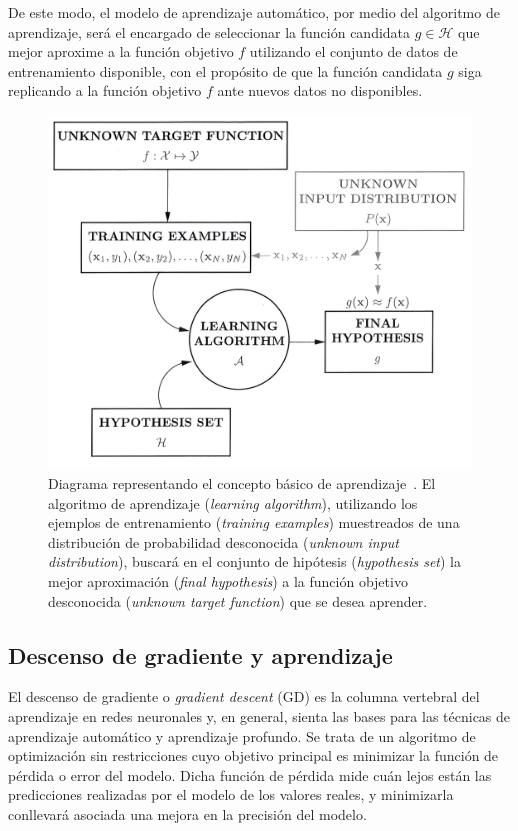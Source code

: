 De este modo, el modelo de aprendizaje automático, por medio del algoritmo de aprendizaje, será el encargado de seleccionar la función candidata $g \in \mathcal{H}$ que mejor aproxime a la función objetivo $f$ utilizando el conjunto de datos de entrenamiento disponible, con el propósito de que la función candidata $g$ siga replicando a la función objetivo $f$ ante nuevos datos no disponibles.\newline

\begin{figure}[h]
    \centering
    \includegraphics[width=0.7\linewidth]{img/learning-diagram.png}
    \caption[Diagrama representando el concepto básico de aprendizaje.]{Diagrama representando el concepto básico de aprendizaje~\cite{Mostafa2012}. El algoritmo de aprendizaje (\textit{learning algorithm}), utilizando los ejemplos de entrenamiento (\textit{training examples}) muestreados de una distribución de probabilidad desconocida (\textit{unknown input distribution}), buscará en el conjunto de hipótesis (\textit{hypothesis set}) la mejor aproximación (\textit{final hypothesis}) a la función objetivo desconocida (\textit{unknown target function}) que se desea aprender.}\label{fig:learning-diagram}
\end{figure}

\subsection{Descenso de gradiente y aprendizaje}\label{subsec:descenso-gradiente}

El descenso de gradiente o \emph{gradient descent} (GD) es la columna vertebral del aprendizaje en redes neuronales y, en general, sienta las bases para las técnicas de aprendizaje automático y aprendizaje profundo. Se trata de un algoritmo de optimización sin restricciones cuyo objetivo principal es minimizar la función de pérdida o error del modelo. Dicha función de pérdida mide cuán lejos están las predicciones realizadas por el modelo de los valores reales, y minimizarla conllevará asociada una mejora en la precisión del modelo.\newline

